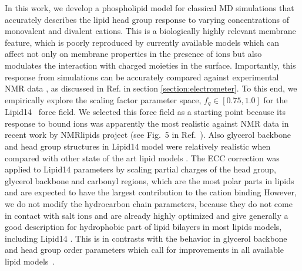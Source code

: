 \documentclass[aip,jcp,twocolumn]{revtex4}
\begin{document}
In this work, we develop a phospholipid model for classical MD simulations that
accurately describes the lipid head group response to varying concentrations
of monovalent and divalent cations. This is a biologically highly relevant membrane feature, which is
poorly reproduced by currently available models which can affect not only on membrane properties
in the presence of ions but also modulates the interaction with charged moieties in the surface.
Importantly, this response from simulations can be accurately
compared against experimental NMR data \cite{akutsu81,altenbach84,scherer89},
as discussed in Ref.  in section \ref{section:electrometer}.
To this end, we empirically explore the scaling factor parameter space, $f_q \in [0.75, 1.0]$ for the Lipid14~\cite{dickson14} force field.
We selected this force field as a starting point because its response to bound ions was apparently the most realistic against NMR data
in recent work by NMRlipids project (see Fig.~5 in Ref.~).
Also glycerol backbone and head group structures in Lipid14 model were
relatively realistic when compared with other state of the art lipid models \cite{botan15}.
The ECC correction was applied to Lipid14 parameters by scaling partial charges of the head group,
glycerol backbone and carbonyl regions, which are the most polar parts in lipids and
are expected to have the largest contribution to the cation binding
However, we do not modify the hydrocarbon chain parameters, because they
do not come in contact with salt ions and are
already highly optimized and give generally a good description for
hydrophobic part of lipid bilayers in most lipids models, including Lipid14 \cite{ollila16}.
This is in contrasts with the behavior in glycerol backbone and head group order
parameters which call for improvements in all available lipid models~\cite{botan15}. 
\end{document}
